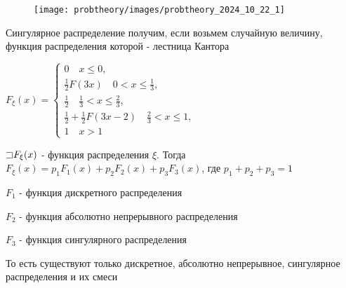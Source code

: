 \documentclass[12pt]{article}
\begin{document}
    \begin{minipage}{\textwidth}
        \begin{wrapfigure}{r}{0pt}
            \texttt{[image: probtheory/images/probtheory\_2024\_10\_22\_1]}
        \end{wrapfigure}







        \Exs Сингулярное распределение получим, если возьмем случайную величину, функция распределения которой - 
        лестница Кантора
    
        $F_\xi(x) = \begin{cases}0 \quad x \leq 0, \\ \frac{1}{2}F(3x) \quad 0 < x \leq \frac{1}{3}, \\ \frac{1}{2} \quad \frac{1}{3} < x \leq \frac{2}{3}, \\ \frac{1}{2} + \frac{1}{2}F(3x - 2) \quad \frac{2}{3} < x \leq 1, \\ 1 \quad x > 1\end{cases}$
    \end{minipage}

    \hypertarget{lebesguetheorem}{}

    \begin{MyTheorem}

        $\mathord{\sqsupset} F_\xi(x)$ - функция распределения $\xi$. Тогда $F_\xi(x) = p_1 F_1(x) + p_2 F_2(x) + p_3 F_3(x)$, где $p_1 + p_2 + p_3 = 1$

        $F_1$ - функция дискретного распределения

        $F_2$ - функция абсолютно непрерывного распределения

        $F_3$ - функция сингулярного распределения

        То есть существуют только дискретное, абсолютно непрерывное, сингулярное распределения и их смеси
    \end{MyTheorem}
\end{document}
